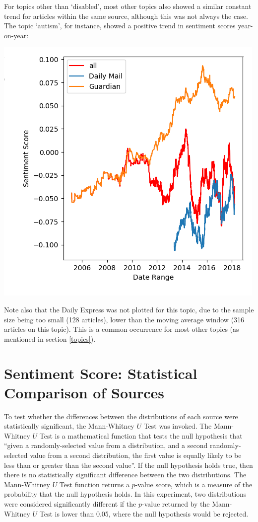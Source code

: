 \documentclass{report}
\begin{document}
For topics other than `disabled', most other topics also showed a similar constant trend for articles within the same source, although this was not always the case. 
The topic `autism', for instance, showed a positive trend in sentiment scores year-on-year:

\begin{center}
	\includegraphics[width=0.5\linewidth]{autism.png}
\end{center}

Note also that the Daily Express was not plotted for this topic, due to the sample size being too small (128 articles), lower than the moving average window (316 articles on this topic). 
This is a common occurrence for most other topics (as mentioned in section \ref{topics}).

\section{Sentiment Score: Statistical Comparison of Sources} \label{Sentiment score: statistical comparison of different sources}

To test whether the differences between the distributions of each source were statistically significant, the Mann-Whitney $U$ Test \cite{mann1947test} was invoked.
The Mann-Whitney $U$ Test is a mathematical function that tests the null hypothesis that ``given a randomly-selected value from a distribution, and a second randomly-selected value from a second distribution, the first value is equally likely to be less than or greater than the second value''.
If the null hypothesis holds true, then there is no statistically significant difference between the two distributions.
The Mann-Whitney $U$ Test function returns a $p$-value score, which is a measure of the probability that the null hypothesis holds.
In this experiment, two distributions were considered significantly different if the $p$-value returned by the Mann-Whitney $U$ Test is lower than 0.05, where the null hypothesis would be rejected.
\end{document}
